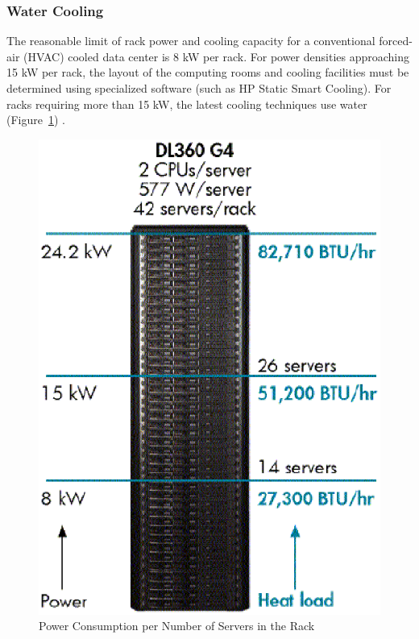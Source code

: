             \subsubsection*{Water Cooling}%
                The reasonable limit of rack power and cooling capacity for a conventional forced-air (HVAC) cooled data center is 8 kW per rack. For power densities approaching 15 kW per rack, the layout of the computing rooms and cooling facilities must be determined using specialized software (such as HP Static Smart Cooling). For racks requiring more than 15 kW, the latest cooling techniques use water (Figure~\ref{fig:power_consumption_number_servers_rack}) \cite{HPCooling07}.
                \begin{figure}[h!tb]
                    \centering
                    \includegraphics[scale=0.5]{graphics/power_consumption_number_servers_rack}
                    \caption{Power Consumption per Number of Servers in the Rack}
                    \label{fig:power_consumption_number_servers_rack}
                \end{figure}
